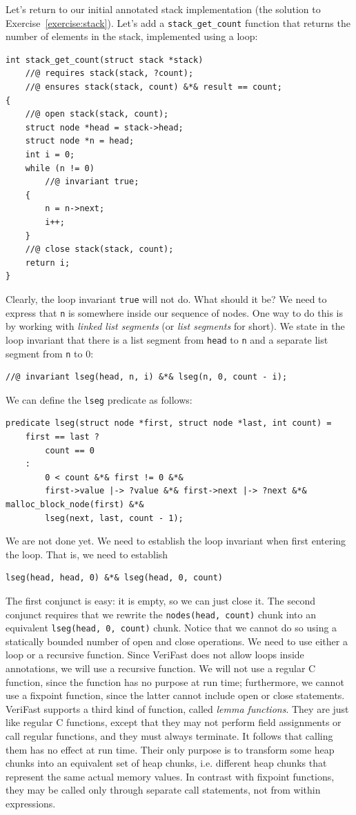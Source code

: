 \documentclass{article}
\begin{document}
Let's return to our initial annotated stack implementation (the
solution to Exercise~\ref{exercise:stack}). Let's add a
\lstinline!stack_get_count! function that returns the number of
elements in the stack, implemented using a loop:
\begin{lstlisting}
int stack_get_count(struct stack *stack)
    //@ requires stack(stack, ?count);
    //@ ensures stack(stack, count) &*& result == count;
{
    //@ open stack(stack, count);
    struct node *head = stack->head;
    struct node *n = head;
    int i = 0;
    while (n != 0)
        //@ invariant true;
    {
        n = n->next;
        i++;
    }
    //@ close stack(stack, count);
    return i;
}
\end{lstlisting}
Clearly, the loop invariant \lstinline!true! will not do. What
should it be? We need to express that \lstinline!n! is
somewhere inside our sequence of nodes. One way to do this is
by working with \emph{linked list segments} (or \emph{list
segments} for short). We state in the loop invariant that there
is a list segment from \lstinline!head! to \lstinline!n! and a
separate list segment from \lstinline!n! to 0:
\begin{lstlisting}
//@ invariant lseg(head, n, i) &*& lseg(n, 0, count - i);
\end{lstlisting}
We can define the \lstinline!lseg! predicate as follows:
\begin{lstlisting}
predicate lseg(struct node *first, struct node *last, int count) =
    first == last ?
        count == 0
    :
        0 < count &*& first != 0 &*&
        first->value |-> ?value &*& first->next |-> ?next &*& malloc_block_node(first) &*&
        lseg(next, last, count - 1);
\end{lstlisting}
We are not done yet. We need to establish the loop invariant
when first entering the loop. That is, we need to establish
\begin{lstlisting}
lseg(head, head, 0) &*& lseg(head, 0, count)
\end{lstlisting}
The first conjunct is easy: it is empty, so we can just close
it. The second conjunct requires that we rewrite the
\lstinline!nodes(head, count)! chunk into an equivalent
\lstinline!lseg(head, 0, count)! chunk. Notice that we cannot
do so using a statically bounded number of open and close
operations. We need to use either a loop or a recursive
function. Since VeriFast does not allow loops inside
annotations, we will use a recursive function. We will not use
a regular C function, since the function has no purpose at run
time; furthermore, we cannot use a fixpoint function, since the
latter cannot include open or close statements. VeriFast
supports a third kind of function, called \emph{lemma
functions}. They are just like regular C functions, except that
they may not perform field assignments or call regular
functions, and they must always terminate. It follows that
calling them has no effect at run time. Their only purpose is
to transform some heap chunks into an equivalent set of heap
chunks, i.e. different heap chunks that represent the same
actual memory values. In contrast with fixpoint functions, they
may be called only through separate call statements, not from
within expressions.
\end{document}
